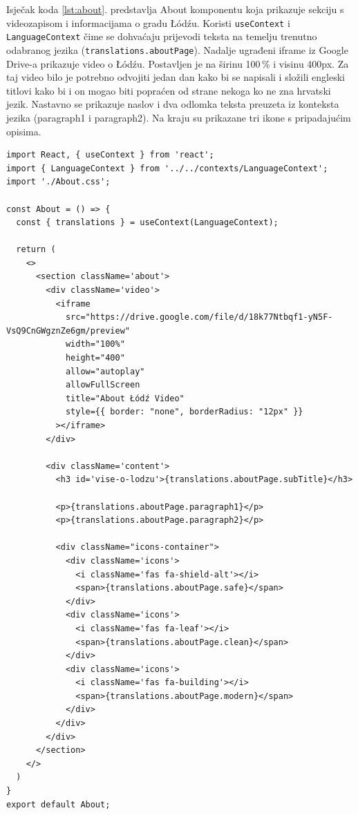 \documentclass[]{foi}
\begin{document}
Isječak koda \ref{lst:about}. predstavlja About komponentu koja prikazuje sekciju s videozapisom i informacijama o gradu Łódźu. Koristi \verb|useContext| i \verb|LanguageContext| čime se dohvaćaju
prijevodi teksta na temelju trenutno odabranog jezika (\verb|translations.aboutPage|). Nadalje ugrađeni iframe iz Google Drive-a prikazuje video o Łódźu.
Postavljen je na širinu 100\,\%  i visinu 400px. Za taj video bilo je potrebno odvojiti jedan dan kako bi se napisali i složili engleski titlovi
kako bi i on mogao biti popraćen od strane nekoga ko ne zna hrvatski jezik. Nastavno se prikazuje naslov i dva odlomka teksta preuzeta iz konteksta
jezika (paragraph1 i paragraph2). Na kraju su prikazane tri ikone s pripadajućim opisima.

\begin{longlisting}
\begin{verbatim}
import React, { useContext } from 'react';
import { LanguageContext } from '../../contexts/LanguageContext'; 
import './About.css';

const About = () => {
  const { translations } = useContext(LanguageContext); 

  return (
    <>
      <section className='about'>
        <div className='video'>
          <iframe
            src="https://drive.google.com/file/d/18k77Ntbqf1-yN5F-VsQ9CnGWgznZe6gm/preview"
            width="100%"
            height="400"
            allow="autoplay"
            allowFullScreen
            title="About Łódź Video"
            style={{ border: "none", borderRadius: "12px" }}
          ></iframe>
        </div>

        <div className='content'>
          <h3 id='vise-o-lodzu'>{translations.aboutPage.subTitle}</h3>

          <p>{translations.aboutPage.paragraph1}</p>
          <p>{translations.aboutPage.paragraph2}</p>

          <div className="icons-container">
            <div className='icons'>
              <i className='fas fa-shield-alt'></i>
              <span>{translations.aboutPage.safe}</span>
            </div>
            <div className='icons'>
              <i className='fas fa-leaf'></i>
              <span>{translations.aboutPage.clean}</span>
            </div>
            <div className='icons'>
              <i className='fas fa-building'></i>
              <span>{translations.aboutPage.modern}</span>
            </div>
          </div>
        </div>
      </section>
    </>
  )
}
export default About;
\end{verbatim}
\caption{About.jsx komponenta}
\label{lst:about}
\end{longlisting}
\end{document}
